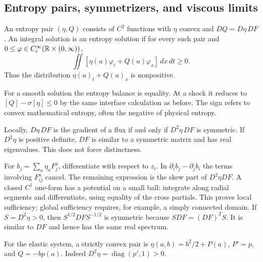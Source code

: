 \subsection{Entropy pairs, symmetrizers, and viscous limits}
\begin{definition}[Source \S11.4.2]
An entropy pair $(\eta,Q)$ consists of $C^2$ functions with $\eta$
convex and $DQ=D\eta\,DF$. An integral solution is an entropy solution
if for every such pair and $0\le\varphi\in C_c^\infty(\mathbb{R}\times(0,\infty))$,
\begin{equation}\label{eq:11-entropy}
 \iint[\eta(u)\varphi_t+Q(u)\varphi_x]\,dx\,dt\ge0.
\end{equation}
Thus the distribution $\eta(u)_t+Q(u)_x$ is nonpositive.
\end{definition}
For a smooth solution the entropy balance is equality. At a shock it
reduces to $[Q]-\sigma[\eta]\le0$ by the same interface calculation
as before. The sign refers to convex mathematical entropy, often
the negative of physical entropy.

\begin{lemma}
Locally, $D\eta\,DF$ is the gradient of a flux if and only if
$D^2\eta\,DF$ is symmetric. If $D^2\eta$ is positive definite,
$DF$ is similar to a symmetric matrix and has real eigenvalues.
This does not force distinctness.
\end{lemma}
\begin{expandedproof}
For $b_j=\sum_a\eta_a F^a_j$, differentiate with respect to $z_i$.
In $\partial_i b_j-\partial_j b_i$ the terms involving $F^a_{ij}$
cancel. The remaining expression is the skew part of $D^2\eta DF$.
A closed $C^1$ one-form has a potential on a small ball: integrate
along radial segments and differentiate, using equality of the cross
partials. This proves local sufficiency; global sufficiency requires,
for example, a simply connected domain. If $S=D^2\eta>0$, then
$S^{1/2}DF S^{-1/2}$ is symmetric because $SDF=(DF)^TS$.
It is similar to $DF$ and hence has the same real spectrum.
\end{expandedproof}
For the elastic system, a strictly convex pair is
$\eta(a,b)=b^2/2+P(a)$, $P'=p$, and $Q=-bp(a)$.
Indeed $D^2\eta=\operatorname{diag}(p',1)>0$.

